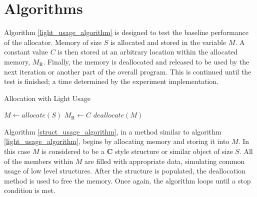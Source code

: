 \documentclass[letterpaper, 10 pt, conference]{ieeeconf}  %
\begin{document}


\section{Algorithms}

Algorithm \ref{light_usage_algorithm} is designed to test the baseline performance of the allocator.
Memory of size $S$ is allocated and stored in the variable $M$.
A constant value $C$ is then stored at an arbitrary location within the allocated memory, $M_\text{R}$.
Finally, the memory is deallocated and released to be used by the next iteration or another part of the overall program.
This is continued until the test is finished; a time determined by the experiment implementation.

\begin{algorithm}[h]
\caption{Allocation with Light Usage}
\begin{algorithmic}
  \STATE $M \leftarrow allocate(S)$
  \STATE $M_\text{R} \leftarrow C$
  \STATE $deallocate(M)$
\ENDWHILE
\end{algorithmic}
\label{light_usage_algorithm}
\end{algorithm}

Algorithm \ref{struct_usage_algorithm}, in a method similar to algorithm \ref{light_usage_algorithm}, begins by allocating memory and storing it into $M$.
In this case $M$ is considered to be a \textbf{C} style structure or similar object of size $S$. 
All of the members within $M$ are filled with appropriate data, simulating common usage of low level structures.
After the structure is populated, the deallocation method is used to free the memory.
Once again, the algorithm loops until a stop condition is met.
\end{document}
